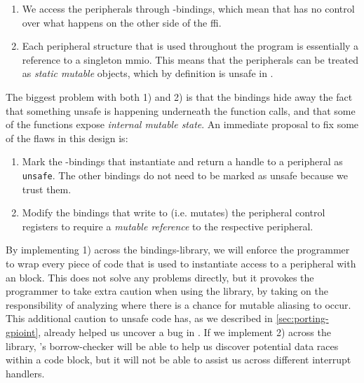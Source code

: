 \begin{enumerate}[\hspace{13pt}1)]
    \item We access the peripherals through {\C}-bindings, which mean that {\rust} has no control over what happens on the other side of the \gls{ffi}.

    \item Each peripheral structure that is used throughout the program is essentially a reference to a singleton \gls{mmio}.
    This means that the peripherals can be treated as \emph{static mutable} objects, which by definition is unsafe in {\rust}.

\end{enumerate}

The biggest problem with both 1) and 2) is that the bindings hide away the fact that something unsafe is happening underneath the function calls, and that some of the functions expose \emph{internal mutable state}.
An immediate proposal to fix some of the flaws in this design is:

\begin{enumerate}[\hspace{13pt}1)]
    \item Mark the {\rust}-bindings that instantiate and return a handle to a peripheral as \texttt{unsafe}.
    The other bindings do not need to be marked as unsafe because we trust them.

    \item Modify the bindings that write to (i.e. mutates) the peripheral control registers to require a \emph{mutable reference} to the respective peripheral.
\end{enumerate}

By implementing 1) across the bindings-library, we will enforce the programmer to wrap every piece of code that is used to instantiate access to a peripheral with an  block.
This does not solve any problems directly, but it provokes the programmer to take extra caution when using the library, by taking on the responsibility of analyzing where there is a chance for mutable aliasing to occur.
This additional caution to unsafe code has, as we described in \autoref{sec:porting-gpioint}, already helped us uncover a bug in .
If we implement 2) across the library, {\rust}'s borrow-checker will be able to help us discover potential data races within a code block, but it will not be able to assist us across different interrupt handlers.

